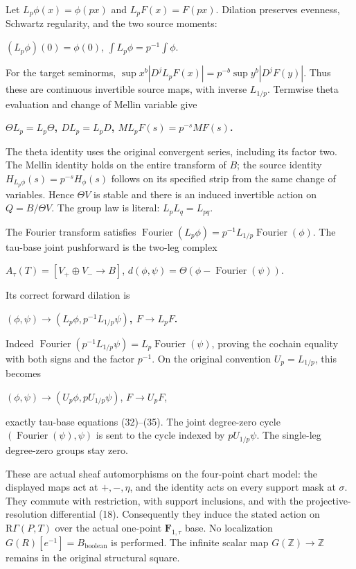 Let \(L_p \phi(x)=\phi(px)\) and \(L_p F(x)=F(px)\). Dilation preserves evenness, Schwartz regularity, and the two source moments:

\((L_p \phi)(0)=\phi(0)\), \(\int L_p \phi=p^{-1} \int \phi\).

For the target seminorms, \(\sup x^b|D^j L_pF(x)|=p^{-b}\sup y^b|D^jF(y)|\). Thus these are continuous invertible source maps, with inverse \(L_{1/p}\). Termwise theta evaluation and change of Mellin variable give

\textbf{\(\Theta L_p=L_p \Theta\), \(D L_p=L_pD\), \(M L_pF(s)=p^{-s}MF(s)\).}

The theta identity uses the original convergent series, including its factor two. The Mellin identity holds on the entire transform of \(B\); the source identity \(H_{L_p \phi}(s)=p^{-s}H_\phi(s)\) follows on its specified strip from the same change of variables. Hence \(\Theta V\) is stable and there is an induced invertible action on \(Q=B/\Theta V\). The group law is literal: \(L_p L_q=L_{pq}\).

The Fourier transform satisfies \(\operatorname{Fourier}(L_p \phi)=p^{-1}L_{1/p} \operatorname{Fourier}(\phi)\). The tau-base joint pushforward is the two-leg complex

\(A_\tau(T)=[V_{+}\oplus V_{-}\to B]\), \(d(\phi,\psi)=\Theta(\phi-\operatorname{Fourier}(\psi))\).

Its correct forward dilation is

\textbf{\((\phi,\psi) \to  (L_p \phi,p^{-1}L_{1/p}\psi)\), \(F \to  L_pF\).}

Indeed \(\operatorname{Fourier}(p^{-1}L_{1/p}\psi)=L_p \operatorname{Fourier}(\psi)\), proving the cochain equality with both signs and the factor \(p^{-1}\). On the original convention \(U_p=L_{1/p}\), this becomes

\((\phi,\psi)\to (U_p \phi,p U_{1/p}\psi)\), \(F\to U_pF\),

exactly tau-base equations (32)--(35). The joint degree-zero cycle \((\operatorname{Fourier}(\psi),\psi)\) is sent to the cycle indexed by \(p U_{1/p}\psi\). The single-leg degree-zero groups stay zero.

These are actual sheaf automorphisms on the four-point chart model: the displayed maps act at \(+,-,\eta\), and the identity acts on every support mask at \(\sigma\). They commute with restriction, with support inclusions, and with the projective-resolution differential (18). Consequently they induce the stated action on \(\mathrm R\Gamma(P,T)\) over the actual one-point \(\mathbf F_{1,\tau}\) base. No localization \(G(R)[e^{-1}]=B_{\mathrm{boolean}}\) is performed. The infinite scalar map \(G(\mathbb Z)\to\mathbb Z\) remains in the original structural square.


